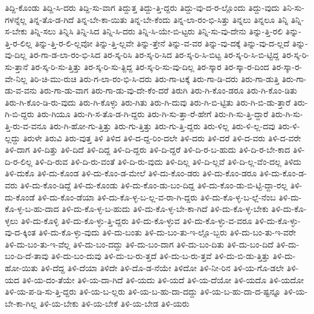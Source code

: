 {ತಿದ್ದಿ-ಕೊಂಡು
ತಿದ್ದಿ-ಸಿ-ದರು
ತಿದ್ದಿ-ಸು-ವಾಗ
ತಿದ್ದುತ್ತ
ತಿದ್ದು-ತ್ತಿ-ದ್ದರು
ತಿದ್ದು-ವು-ದ-ರ-ಲ್ಲೊಂದು
ತಿದ್ದು-ವುದು
ತಿನಿ-ಸು-ಗಳನ್ನೆಲ್ಲ
ತಿನ್ನ-ತೊ-ಡ-ಗಿದೆ
ತಿನ್ನ-ಬೇ-ಕಾ-ಯಿತು
ತಿನ್ನ-ಬೇ-ಕೆಂದು
ತಿನ್ನ-ಲಾ-ರಂ-ಭಿ-ಸಿತ್ತು
ತಿನ್ನಲು
ತಿನ್ನಲೂ
ತಿನ್ನಿ
ತಿನ್ನಿ-ಸ-ಬೇಕು
ತಿನ್ನಿ-ಸಲು
ತಿನ್ನಿಸಿ
ತಿನ್ನಿ-ಸಿದ
ತಿನ್ನಿ-ಸಿ-ದರು
ತಿನ್ನಿ-ಸಿ-ಯೇ-ಬಿ-ಟ್ಟರು
ತಿನ್ನಿ-ಸು-ವು-ದೇನು
ತಿನ್ನು-ತ್ತಿ-ರಲಿ
ತಿನ್ನು-ತ್ತಿ-ರ-ಲಿಲ್ಲ
ತಿನ್ನು-ತ್ತಿ-ರ-ಲಿ-ಲ್ಲವೋ
ತಿನ್ನು-ತ್ತಿ-ಲ್ಲವೇ
ತಿನ್ನು-ತ್ತೇನೆ
ತಿನ್ನು-ವ-ವರ
ತಿನ್ನು-ವು-ದಕ್ಕೆ
ತಿನ್ನು-ವು-ದ-ಲ್ಲದೆ
ತಿನ್ನು-ವು-ದಿಲ್ಲ
ತಿರ-ಗಾ-ಡ-ಲಾ-ರಂ-ಭಿ-ಸಿದ
ತಿರ-ಸ್ಕ-ರಿಸಿ
ತಿರ-ಸ್ಕ-ರಿ-ಸಿದ
ತಿರ-ಸ್ಕ-ರಿ-ಸಿ-ಬಿಟ್ಟ
ತಿರ-ಸ್ಕ-ರಿ-ಸಿ-ಬಿ-ಟ್ಟಿದ್ದ
ತಿರ-ಸ್ಕ-ರಿ-ಸು-ತ್ತಾನೆ
ತಿರ-ಸ್ಕ-ರಿ-ಸು-ತ್ತಿತ್ತು
ತಿರ-ಸ್ಕ-ರಿ-ಸು-ತ್ದಿದ್ದ
ತಿರ-ಸ್ಕ-ರಿ-ಸು-ವು-ದಿಲ್ಲ
ತಿರ-ಸ್ಕಾರ
ತಿರ-ಸ್ಕಾ-ರ-ದಿಂದ
ತಿರ-ಸ್ಕಾ-ರ-ವೇ-ನಿಲ್ಲ
ತಿರಿ-ಚಿ-ಮು-ರುಚಿ
ತಿರು-ಗ-ಲಾ-ರಂ-ಭಿ-ಸಿ-ದರು
ತಿರು-ಗಾ-ಟಕ್ಕೆ
ತಿರು-ಗಾ-ಡಿ-ದರು
ತಿರು-ಗಾ-ಡುತ್ತಿ
ತಿರು-ಗಾ-ಡು-ವ-ವನು
ತಿರು-ಗಾ-ಡು-ವಾಗ
ತಿರು-ಗಾ-ಡು-ವು-ದೇ-ಕೆಂ-ದರೆ
ತಿರುಗಿ
ತಿರು-ಗಿ-ಕೊಂ-ಡರೂ
ತಿರು-ಗಿ-ಕೊಂ-ಡಿತು
ತಿರು-ಗಿ-ಕೊಂ-ಡಿ-ರು-ವುದು
ತಿರು-ಗಿ-ಕೊಳ್ಳು
ತಿರು-ಗಿತು
ತಿರು-ಗಿ-ದುವು
ತಿರು-ಗಿ-ಬಿ-ಟ್ಟಿತು
ತಿರು-ಗಿ-ಬಿ-ಡು-ತ್ತಾರೆ
ತಿರು-ಗಿ-ಬಿ-ದ್ದರು
ತಿರು-ಗಿಯೂ
ತಿರು-ಗಿ-ಸ-ತೊ-ಡ-ಗಿ-ದ್ದರು
ತಿರು-ಗಿ-ಸು-ತ್ತಾ-ರೆ-ಹೇಗೆ
ತಿರು-ಗಿ-ಸು-ತ್ತಿ-ದ್ದಾರೆ
ತಿರು-ಗಿ-ಸು-ತ್ತಿ-ರು-ವ-ವನೂ
ತಿರು-ಗಿ-ಹೋ-ಗು-ತ್ತಿತ್ತು
ತಿರು-ಗು-ತ್ತಿತ್ತು
ತಿರು-ಗು-ತ್ತಿ-ದ್ದರು
ತಿರು-ಳಿಲ್ಲ
ತಿರು-ಳಿ-ಲ್ಲ-ದವು
ತಿರು-ಳಿ-ಲ್ಲದ್ದು
ತಿರುಳೇ
ತಿರುವಿ
ತಿರು-ವುತ್ತ
ತಿಳಿ
ತಿಳಿದ
ತಿಳಿ-ದ-ದ್ದ-ರಿಂ-ದಲೇ
ತಿಳಿ-ದರು
ತಿಳಿ-ದರೆ
ತಿಳಿ-ದ-ವರು
ತಿಳಿ-ದ-ವರೇ
ತಿಳಿ-ದಾಗ
ತಿಳಿ-ದಿತ್ತು
ತಿಳಿ-ದಿದೆ
ತಿಳಿ-ದಿದ್ದ
ತಿಳಿ-ದಿ-ದ್ದರು
ತಿಳಿ-ದಿ-ದ್ದರೆ
ತಿಳಿ-ದಿ-ರ-ಬ-ಹುದು
ತಿಳಿ-ದಿ-ರ-ಬೇ-ಕಾದ
ತಿಳಿ-ದಿ-ರ-ಲಿಲ್ಲ
ತಿಳಿ-ದಿ-ರುವ
ತಿಳಿ-ದಿ-ರು-ವಂತೆ
ತಿಳಿ-ದಿ-ರು-ವುದು
ತಿಳಿ-ದಿಲ್ಲ
ತಿಳಿ-ದಿ-ಲ್ಲವೆ
ತಿಳಿ-ದಿ-ಲ್ಲ-ವೆಂ-ದಲ್ಲ
ತಿಳಿದು
ತಿಳಿ-ದುಕೊ
ತಿಳಿ-ದು-ಕೊಂಡ
ತಿಳಿ-ದು-ಕೊಂ-ಡ-ಮೇಲೆ
ತಿಳಿ-ದು-ಕೊಂ-ಡರು
ತಿಳಿ-ದು-ಕೊಂ-ಡರೂ
ತಿಳಿ-ದು-ಕೊಂ-ಡ-ವರು
ತಿಳಿ-ದು-ಕೊಂ-ಡಿದ್ದೆ
ತಿಳಿ-ದು-ಕೊಂಡು
ತಿಳಿ-ದು-ಕೊಂ-ಡು-ಬಂ-ದಿದ್ದ
ತಿಳಿ-ದು-ಕೊಂ-ಡು-ಬಿ-ಟ್ಟಿ-ದ್ದಾ-ರಲ್ಲ
ತಿಳಿ-ದು-ಕೊಂಡೆ
ತಿಳಿ-ದು-ಕೊಂ-ಡೆಯಾ
ತಿಳಿ-ದು-ಕೊ-ಳ್ಳ-ಬ-ಲ್ಲ-ವ-ರಾ-ಗಿ-ದ್ದರು
ತಿಳಿ-ದು-ಕೊ-ಳ್ಳ-ಬ-ಲ್ಲೆ-ನೆಂಬ
ತಿಳಿ-ದು-ಕೊ-ಳ್ಳ-ಬ-ಹು-ದಾದ
ತಿಳಿ-ದು-ಕೊ-ಳ್ಳ-ಬ-ಹುದು
ತಿಳಿ-ದು-ಕೊ-ಳ್ಳ-ಬೇ-ಕಾ-ಗಿದೆ
ತಿಳಿ-ದು-ಕೊ-ಳ್ಳ-ಬೇಕು
ತಿಳಿ-ದು-ಕೊ-ಳ್ಳಲು
ತಿಳಿ-ದು-ಕೊಳ್ಳಿ
ತಿಳಿ-ದು-ಕೊ-ಳ್ಳು-ತ್ತಿ-ದ್ದರು
ತಿಳಿ-ದು-ಕೊ-ಳ್ಳುವ
ತಿಳಿ-ದು-ಕೊ-ಳ್ಳು-ವ-ವರೂ
ತಿಳಿ-ದು-ಕೊ-ಳ್ಳು-ವು-ದ-ಕ್ಕಿಂತ
ತಿಳಿ-ದು-ಕೊ-ಳ್ಳು-ವುದು
ತಿಳಿ-ದು-ಬಂತು
ತಿಳಿ-ದು-ಬಂ-ತು-ಇ-ಲ್ಲೊ-ಬ್ಬರು
ತಿಳಿ-ದು-ಬಂ-ತು-ಇ-ವರೇ
ತಿಳಿ-ದು-ಬಂ-ತು-ಇ-ವೆಲ್ಲ
ತಿಳಿ-ದು-ಬಂ-ದದ್ದು
ತಿಳಿ-ದು-ಬಂ-ದಾಗ
ತಿಳಿ-ದು-ಬಂ-ದಿತು
ತಿಳಿ-ದು-ಬಂ-ದಿದೆ
ತಿಳಿ-ದು-ಬಂ-ದಿ-ದೆ-ತಾವು
ತಿಳಿ-ದು-ಬಂ-ದುವು
ತಿಳಿ-ದು-ಬ-ರು-ತ್ತದೆ
ತಿಳಿ-ದು-ಬ-ರು-ತ್ತವೆ
ತಿಳಿ-ದು-ಬಿ-ಡು-ತ್ತಿತ್ತು
ತಿಳಿ-ದು-ಹೋ-ಯಿತು
ತಿಳಿ-ದೆದ್ದ
ತಿಳಿ-ದೆಯಾ
ತಿಳಿದೇ
ತಿಳಿ-ದೊ-ಡ-ನೆಯೇ
ತಿಳಿದೋ
ತಿಳಿ-ನೀ-ರಿನ
ತಿಳಿ-ಯ-ಗೊ-ಡಲೇ
ತಿಳಿ-ಯದ
ತಿಳಿ-ಯ-ದಂ-ತೆಯೇ
ತಿಳಿ-ಯ-ದಾ-ಗಿದೆ
ತಿಳಿ-ಯದು
ತಿಳಿ-ಯದೆ
ತಿಳಿ-ಯ-ದೆಯೋ
ತಿಳಿ-ಯದೊ
ತಿಳಿ-ಯದೋ
ತಿಳಿ-ಯ-ಪ-ಡಿ-ಸು-ತ್ತಿ-ದ್ದರು
ತಿಳಿ-ಯ-ಬ-ಲ್ಲರು
ತಿಳಿ-ಯ-ಬ-ಹು-ದಾ-ದದ್ದು
ತಿಳಿ-ಯ-ಬ-ಹು-ದಾ-ದ-ಷ್ಟನ್ನೂ
ತಿಳಿ-ಯ-ಬೇ-ಕಾ-ಗಿಲ್ಲ
ತಿಳಿ-ಯ-ಬೇಕು
ತಿಳಿ-ಯ-ಬೇಕೆ
ತಿಳಿ-ಯ-ಬೇಡ
ತಿಳಿ-ಯರು
}
